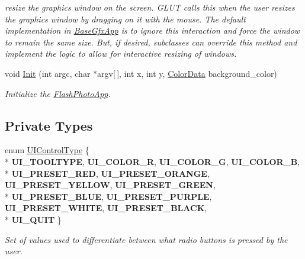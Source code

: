 \begin{DoxyCompactItemize}
\begin{DoxyCompactList}\small\item\em resize the graphics window on the screen. G\+L\+UT calls this when the user resizes the graphics window by dragging on it with the mouse. The default implementation in \hyperlink{classimage__tools_1_1BaseGfxApp}{Base\+Gfx\+App} is to ignore this interaction and force the window to remain the same size. But, if desired, subclasses can override this method and implement the logic to allow for interactive resizing of windows. \end{DoxyCompactList}\item 
void \hyperlink{classimage__tools_1_1FlashPhotoApp_a1bf24fa1a123732fe5d5e1964974dec1}{Init} (int argc, char $\ast$argv\mbox{[}$\,$\mbox{]}, int x, int y, \hyperlink{classimage__tools_1_1ColorData}{Color\+Data} background\+\_\+color)
\begin{DoxyCompactList}\small\item\em Initialize the \hyperlink{classimage__tools_1_1FlashPhotoApp}{Flash\+Photo\+App}. \end{DoxyCompactList}\end{DoxyCompactItemize}
\subsection*{Private Types}
\begin{DoxyCompactItemize}
\item 
enum \hyperlink{classimage__tools_1_1FlashPhotoApp_a31571dcdd2d1ff063ebd20023ebfa261}{U\+I\+Control\+Type} \{ \\*
{\bfseries U\+I\+\_\+\+T\+O\+O\+L\+T\+Y\+PE}, 
{\bfseries U\+I\+\_\+\+C\+O\+L\+O\+R\+\_\+R}, 
{\bfseries U\+I\+\_\+\+C\+O\+L\+O\+R\+\_\+G}, 
{\bfseries U\+I\+\_\+\+C\+O\+L\+O\+R\+\_\+B}, 
\\*
{\bfseries U\+I\+\_\+\+P\+R\+E\+S\+E\+T\+\_\+\+R\+ED}, 
{\bfseries U\+I\+\_\+\+P\+R\+E\+S\+E\+T\+\_\+\+O\+R\+A\+N\+GE}, 
{\bfseries U\+I\+\_\+\+P\+R\+E\+S\+E\+T\+\_\+\+Y\+E\+L\+L\+OW}, 
{\bfseries U\+I\+\_\+\+P\+R\+E\+S\+E\+T\+\_\+\+G\+R\+E\+EN}, 
\\*
{\bfseries U\+I\+\_\+\+P\+R\+E\+S\+E\+T\+\_\+\+B\+L\+UE}, 
{\bfseries U\+I\+\_\+\+P\+R\+E\+S\+E\+T\+\_\+\+P\+U\+R\+P\+LE}, 
{\bfseries U\+I\+\_\+\+P\+R\+E\+S\+E\+T\+\_\+\+W\+H\+I\+TE}, 
{\bfseries U\+I\+\_\+\+P\+R\+E\+S\+E\+T\+\_\+\+B\+L\+A\+CK}, 
\\*
{\bfseries U\+I\+\_\+\+Q\+U\+IT}
 \}\hypertarget{classimage__tools_1_1FlashPhotoApp_a31571dcdd2d1ff063ebd20023ebfa261}{}\label{classimage__tools_1_1FlashPhotoApp_a31571dcdd2d1ff063ebd20023ebfa261}
\begin{DoxyCompactList}\small\item\em Set of values used to differentiate between what radio buttons is pressed by the user. \end{DoxyCompactList}
\end{DoxyCompactItemize}
